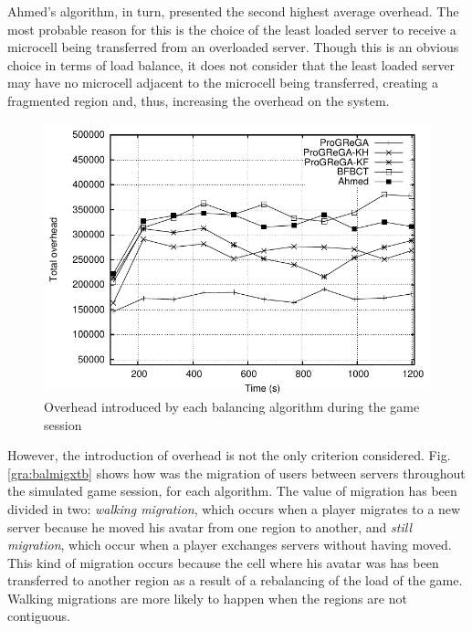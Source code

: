 Ahmed's algorithm, in turn, presented the second highest average overhead. The most probable reason for this is the choice of the least loaded server to receive a microcell being transferred from an overloaded server. Though this is an obvious choice in terms of load balance, it does not consider that the least loaded server may have no microcell adjacent to the microcell being transferred, creating a fragmented region and, thus, increasing the overhead on the system.

\begin{figure}[!t]
  \centering
  \includegraphics[width=0.75\linewidth]{images/baloverhead_ah}
  \caption{Overhead introduced by each balancing algorithm during the game session}
  \label{gra:baloverhead}
\end{figure}

However, the introduction of overhead is not the only criterion considered. Fig. \ref{gra:balmigxtb} shows how was the migration of users between servers throughout the simulated game session, for each algorithm. The value of migration has been divided in two: \emph{walking migration}, which occurs when a player migrates to a new server because he moved his avatar from one region to another, and \emph{still migration}, which occur when a player exchanges servers without having moved. This kind of migration occurs because the cell where his avatar was has been transferred to another region as a result of a rebalancing of the load of the game. Walking migrations are more likely to happen when the regions are not contiguous.

